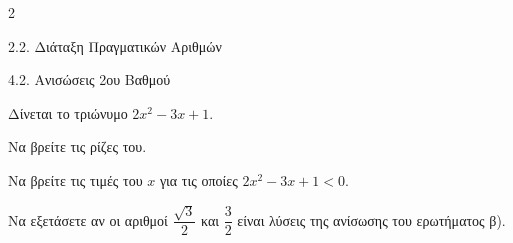 \begin{ylh}{2}
    \item 2.2. Διάταξη Πραγματικών Αριθμών
    \item 4.2. Ανισώσεις 2ου Βαθμού
\end{ylh}
Δίνεται το τριώνυμο $2x^2 - 3x + 1$.

\begin{alist}
\item Να βρείτε τις ρίζες του.
\item Να βρείτε τις τιμές του $x$ για τις οποίες $2x^2 - 3x + 1 < 0$.
\item Να εξετάσετε αν οι αριθμοί $\dfrac{\sqrt{3}}{2}$ και $\dfrac{3}{2}$ είναι λύσεις της ανίσωσης του ερωτήματος β).
\end{alist}

